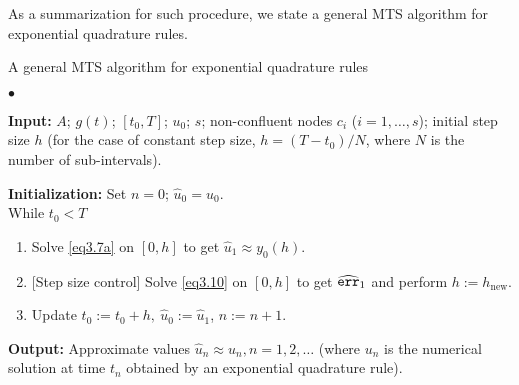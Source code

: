 As a summarization for such procedure, we state a general MTS algorithm for exponential quadrature rules.
\begin{algorithm}
\caption{A general MTS algorithm for exponential quadrature rules}
\label{alg1}
\begin{list}{$\bullet $}{}  
\item \textbf{Input:}  $A$; $g(t)$; $[t_0, T]$;  $u_0$; $s$; non-confluent nodes $c_i$ ($i=1,\ldots,s$); initial step size $h$ (for the case of constant step size, $h=(T-t_0)/N$, where $N$ is the number of sub-intervals).
\item \textbf{Initialization:}  Set $n=0$; $\hat{u}_0=u_0$. \\
While $t_0<T$
\begin{enumerate}
  \item Solve \eqref{eq3.7a} on $[0, h]$  to get $\hat{u}_1 \approx y_0(h).$
  \item  {[}Step size control{]} Solve \eqref{eq3.10} on $[0, h]$  to get $\widehat{{\tt err}}_1$ and perform  $h:=h_{\text{new}}$.
  \item Update $ t_0:=t_0+h, \ \hat{u}_0:=\hat{u}_1$, $n:=n+1$. 
\end{enumerate}
\item \textbf{Output:} Approximate values $\hat{u}_n\approx u_n, n=1,2,\ldots$ (where
$u_n$ is the numerical solution at time $t_n$ obtained by an exponential quadrature rule).
\end{list}
\end{algorithm}
